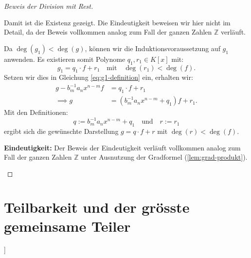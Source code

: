 \begin{proof}[Beweis der Division mit Rest]
\begin{spoken-clean}[00:28:00 - 00:28:47]
Damit ist die Existenz gezeigt. Die Eindeutigkeit beweisen wir hier nicht im Detail, da der Beweis vollkommen analog zum Fall der ganzen Zahlen $\mathbb{Z}$ verläuft.
\end{spoken-clean}

\begin{math-stroke}
Da $\deg(g_1) < \deg(g)$, können wir die Induktionsvoraussetzung auf $g_1$ anwenden. Es existieren somit Polynome $q_1, r_1 \in K[x]$ mit:
\[
g_1 = q_1 \cdot f + r_1 \quad \text{mit} \quad \deg(r_1) < \deg(f).
\]
Setzen wir dies in Gleichung \eqref{eq:g1-definition} ein, erhalten wir:
\begin{align*}
g - b_m^{-1} a_n x^{n-m} f &= q_1 \cdot f + r_1 \\
\implies g &= \left( b_m^{-1} a_n x^{n-m} + q_1 \right) f + r_1.
\end{align*}
Mit den Definitionen:
\[
q := b_m^{-1} a_n x^{n-m} + q_1 \quad \text{und} \quad r := r_1
\]
ergibt sich die gewünschte Darstellung $g = q \cdot f + r$ mit $\deg(r) < \deg(f).$

\textbf{Eindeutigkeit:}
Der Beweis der Eindeutigkeit verläuft vollkommen analog zum Fall der ganzen Zahlen $\mathbb{Z}$ unter Ausnutzung der Gradformel (\cref{lem:grad-produkt}).
\end{math-stroke}
\end{proof}

\section{Teilbarkeit und der grösste gemeinsame Teiler}

\begin{math-stroke}[Teilbarkeit in K[x]]
\end{math-stroke}

